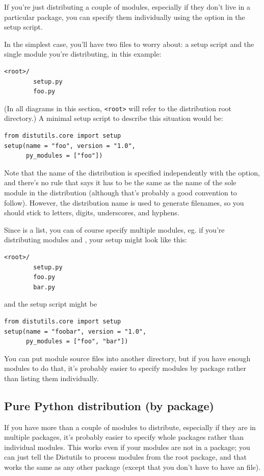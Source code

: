 \documentclass{howto}
\begin{document}
If you're just distributing a couple of modules, especially if they
don't live in a particular package, you can specify them individually
using the  option in the setup script.

In the simplest case, you'll have two files to worry about: a setup
script and the single module you're distributing,  in this
example:
\begin{verbatim}
<root>/
        setup.py
        foo.py
\end{verbatim}
(In all diagrams in this section, \verb|<root>| will refer to the
distribution root directory.)  A minimal setup script to describe this
situation would be:
\begin{verbatim}
from distutils.core import setup
setup(name = "foo", version = "1.0",
      py_modules = ["foo"])
\end{verbatim}
Note that the name of the distribution is specified independently with
the  option, and there's no rule that says it has to be the
same as the name of the sole module in the distribution (although that's
probably a good convention to follow).  However, the distribution name
is used to generate filenames, so you should stick to letters, digits,
underscores, and hyphens.

Since  is a list, you can of course specify multiple 
modules, eg. if you're distributing modules  and
, your setup might look like this:
\begin{verbatim}
<root>/
        setup.py
        foo.py
        bar.py
\end{verbatim}
and the setup script might be
\begin{verbatim}
from distutils.core import setup
setup(name = "foobar", version = "1.0",
      py_modules = ["foo", "bar"])
\end{verbatim}

You can put module source files into another directory, but if you have
enough modules to do that, it's probably easier to specify modules by
package rather than listing them individually.


\subsection{Pure Python distribution (by package)}
\label{pure-pkg}

If you have more than a couple of modules to distribute, especially if
they are in multiple packages, it's probably easier to specify whole
packages rather than individual modules.  This works even if your
modules are not in a package; you can just tell the Distutils to process
modules from the root package, and that works the same as any other
package (except that you don't have to have an 
file).
\end{document}
